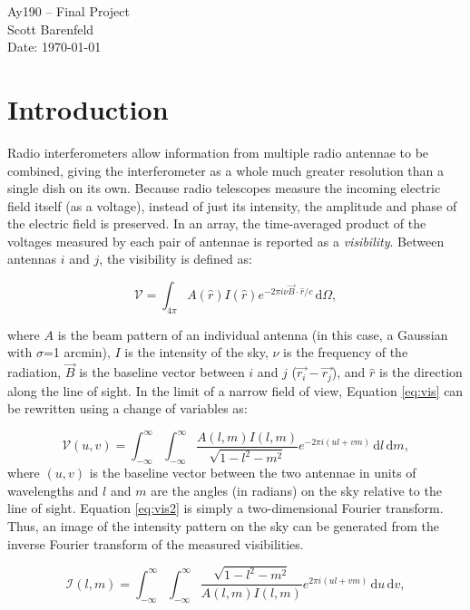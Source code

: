 \documentclass[11pt,letterpaper]{article}
\begin{document}
\begin{center}
\Large
Ay190 -- Final Project\\
Scott Barenfeld\\
Date: \today
\end{center}

\section{Introduction}
Radio interferometers allow information from multiple radio antennae to be 
combined, giving the interferometer as a whole much greater resolution than 
a single dish on its own.  Because radio telescopes measure the incoming 
electric field itself (as a voltage), instead of just its intensity, the 
amplitude and phase of the electric field is preserved.  In an array, the 
time-averaged product of the voltages measured by each pair of antennae is 
reported as a \emph{visibility}.  Between antennas $i$ and $j$, the 
visibility is defined as:

\begin{equation}\label{eq:vis}
\mathcal{V}=\int_{4\pi} \! A(\hat{r})I(\hat{r})e^{-2\pi i\nu\vec{B}\cdot\hat{r}/c} \, \mathrm{d}\Omega,
\end{equation} 

where $A$ is the beam pattern of an individual antenna (in this case, a Gaussian 
with $\sigma$=1 arcmin), $I$ is the intensity 
of the sky, $\nu$ is the frequency of the radiation, $\vec{B}$ is the baseline 
vector between $i$ and $j$ ($\vec{r_i}-\vec{r_j}$), and $\hat{r}$ is the 
direction along the line of sight.  In the limit of a narrow field of view, 
Equation \ref{eq:vis} can be rewritten using a change of variables as: 

\begin{equation}\label{eq:vis2}
\mathcal{V}(u,v)=\int_{-\infty}^{\infty} \! \int_{-\infty}^{\infty} \! \frac{A(l,m)I(l,m)}{\sqrt{1-l^2-m^2}}e^{-2\pi i(ul+vm)} \, \mathrm{d}l \, \mathrm{d}m,
\end{equation}
where $(u,v)$ is the baseline vector between the two antennae in units of 
wavelengths and $l$ and $m$ are the angles (in radians) on the sky relative 
to the line of sight.  Equation \ref{eq:vis2} is simply a two-dimensional 
Fourier transform.  Thus, an image of the intensity pattern on the sky can 
be generated from the inverse Fourier transform of the measured visibilities.

\begin{equation}\label{eq:vis3}
\mathcal{I}(l,m)=\int_{-\infty}^{\infty} \! \int_{-\infty}^{\infty} \! \frac{\sqrt{1-l^2-m^2}}{A(l,m)I(l,m)}e^{2\pi i(ul+vm)} \, \mathrm{d}u \, \mathrm{d}v,
\end{equation}  
\end{document}
